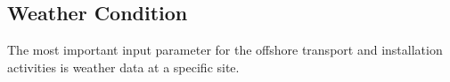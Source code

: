 \subsection{Weather Condition}

The most important input parameter for the offshore transport and installation activities is weather data at a specific site. 